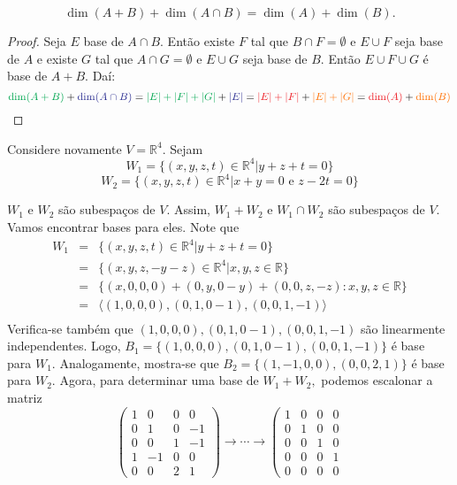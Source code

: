 \documentclass[11pt,twoside,a4paper]{book}
\begin{document}
\begin{teorema}
\[
\dim(A+B)+\dim(A\cap B)=\dim(A)+\dim(B).
\]
\end{teorema}
\begin{proof}
Seja $E$ base de $A\cap B$. Então existe $F$ tal que $B\cap F=\emptyset$ e $E\cup F$ seja base de $A$ e existe $G$ tal que $A\cap G=\emptyset$ e $E\cup G$ seja base de $B$. Então $E\cup F\cup G$ é base de $A+B$. Daí:
\[
\textcolor{Green}{\dim(A+B)} + \textcolor{Blue}{\dim(A \cap B)} = \textcolor{Green}{\abs{E} + \abs{F} + \abs{G}} + \textcolor{Blue}{\abs{E}} = \textcolor{Red}{\abs{E} + \abs{F}} + \textcolor{Laranja}{\abs{E} + \abs{G}} = \textcolor{Red}{\dim(A)} + \textcolor{Laranja}{\dim(B)}
\]
\end{proof}

\begin{exemplo}
Considere novamente $V = \mathbb{R}^4$. Sejam
\[
W_1 = \{(x,y,z,t) \in \mathbb{R}^4 | y + z + t = 0 \}
\]
\[
W_2 = \{(x,y,z,t) \in \mathbb{R}^4 | x +y = 0 \mbox{ e } z - 2t = 0 \}
\]

$W_1$ e $W_2$ são subespaços de $V.$ Assim, $W_1 + W_2$ e $W_1 \cap W_2$ são subespaços de $V.$ Vamos encontrar bases para eles.
Note que 
\[
\begin{array}{lcl}
W_1 &=& \{(x,y,z,t) \in \mathbb{R}^4 | y + z + t = 0 \} \\
&=& \{(x,y,z,-y-z) \in \mathbb{R}^4 | x,y,z \in \mathbb{R} \} \\
&=& \{ (x,0,0,0) + (0,y,0-y) + (0,0,z,-z) : x,y,z \in \mathbb{R} \} \\
&=& \langle (1,0,0,0), (0,1,0-1), (0,0,1,-1) \rangle\\
\end{array}
\]
Verifica-se também que $(1,0,0,0), (0,1,0-1), (0,0,1,-1)$ são linearmente independentes. Logo, $B_1 = \{ (1,0,0,0), (0,1,0-1), (0,0,1,-1) \}$ é base para $W_1.$
Analogamente, mostra-se que $B_2 = \{ (1,-1,0,0), (0,0,2,1) \}$ é base para $W_2.$
Agora, para determinar uma base de $W_1 + W_2,$ podemos escalonar a matriz
\[
\left( \begin{array}{cccc}
1 & 0 & 0 & 0\\
0 & 1 & 0 & -1 \\
0 & 0 & 1 & -1 \\
1 & -1 & 0 & 0\\
0 & 0 & 2 & 1

\end{array} \right) \rightarrow \cdots \rightarrow \left( \begin{array}{cccc}
1 & 0 & 0 & 0\\
0 & 1 & 0 & 0 \\
0 & 0 & 1 & 0 \\
0& 0& 0 & 1\\
0 & 0 & 0 & 0


\end{array}\]
\end{exemplo}
\end{document}

